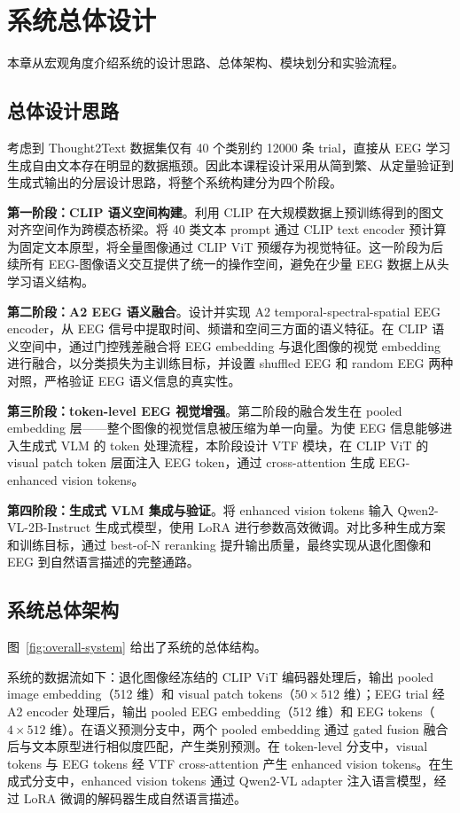 \section{系统总体设计}

本章从宏观角度介绍系统的设计思路、总体架构、模块划分和实验流程。

\subsection{总体设计思路}

考虑到 Thought2Text 数据集仅有 40 个类别约 12000 条 trial，直接从 EEG 学习生成自由文本存在明显的数据瓶颈。因此本课程设计采用从简到繁、从定量验证到生成式输出的分层设计思路，将整个系统构建分为四个阶段。

\textbf{第一阶段：CLIP 语义空间构建}。利用 CLIP 在大规模数据上预训练得到的图文对齐空间作为跨模态桥梁。将 40 类文本 prompt 通过 CLIP text encoder 预计算为固定文本原型，将全量图像通过 CLIP ViT 预缓存为视觉特征。这一阶段为后续所有 EEG-图像语义交互提供了统一的操作空间，避免在少量 EEG 数据上从头学习语义结构。

\textbf{第二阶段：A2 EEG 语义融合}。设计并实现 A2 temporal-spectral-spatial EEG encoder，从 EEG 信号中提取时间、频谱和空间三方面的语义特征。在 CLIP 语义空间中，通过门控残差融合将 EEG embedding 与退化图像的视觉 embedding 进行融合，以分类损失为主训练目标，并设置 shuffled EEG 和 random EEG 两种对照，严格验证 EEG 语义信息的真实性。

\textbf{第三阶段：token-level EEG 视觉增强}。第二阶段的融合发生在 pooled embedding 层——整个图像的视觉信息被压缩为单一向量。为使 EEG 信息能够进入生成式 VLM 的 token 处理流程，本阶段设计 VTF 模块，在 CLIP ViT 的 visual patch token 层面注入 EEG token，通过 cross-attention 生成 EEG-enhanced vision tokens。

\textbf{第四阶段：生成式 VLM 集成与验证}。将 enhanced vision tokens 输入 Qwen2-VL-2B-Instruct 生成式模型，使用 LoRA 进行参数高效微调。对比多种生成方案和训练目标，通过 best-of-N reranking 提升输出质量，最终实现从退化图像和 EEG 到自然语言描述的完整通路。

\subsection{系统总体架构}

图~\ref{fig:overall-system} 给出了系统的总体结构。


系统的数据流如下：退化图像经冻结的 CLIP ViT 编码器处理后，输出 pooled image embedding（512 维）和 visual patch tokens（$50\times512$ 维）；EEG trial 经 A2 encoder 处理后，输出 pooled EEG embedding（512 维）和 EEG tokens（$4\times512$ 维）。在语义预测分支中，两个 pooled embedding 通过 gated fusion 融合后与文本原型进行相似度匹配，产生类别预测。在 token-level 分支中，visual tokens 与 EEG tokens 经 VTF cross-attention 产生 enhanced vision tokens。在生成式分支中，enhanced vision tokens 通过 Qwen2-VL adapter 注入语言模型，经过 LoRA 微调的解码器生成自然语言描述。

